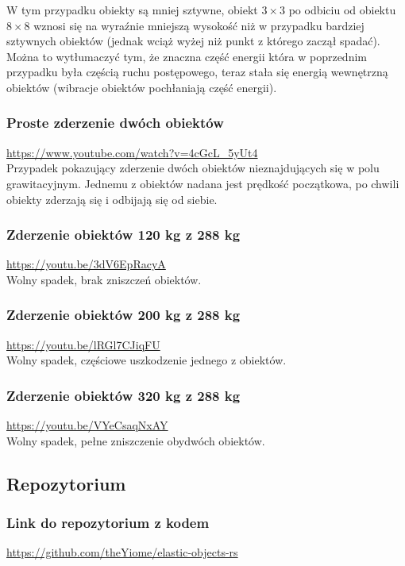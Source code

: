 \documentclass[12pt, letterpaper]{report}
\begin{document}
    W tym przypadku obiekty są mniej sztywne, obiekt $3 \times 3$ po odbiciu 
    od obiektu $8 \times  8$ wznosi się na wyraźnie mniejszą wysokość niż w przypadku bardziej sztywnych obiektów
    (jednak wciąż wyżej niż punkt z którego zaczął spadać). Można to wytłumaczyć tym,
    że znaczna część energii która w poprzednim przypadku była częścią ruchu postępowego,
    teraz stała się energią wewnętrzną obiektów (wibracje obiektów pochłaniają część energii).

    \subsubsection{Proste zderzenie dwóch obiektów}
    \url{https://www.youtube.com/watch?v=4cGcL_5yUt4} \\ 

    Przypadek pokazujący zderzenie dwóch obiektów nieznajdujących się w polu grawitacyjnym.
    Jednemu z obiektów nadana jest prędkość początkowa, po chwili obiekty zderzają się i 
    odbijają się od siebie.

    \subsubsection{Zderzenie obiektów 120 kg z 288 kg}
    \url{https://youtu.be/3dV6EpRacyA} \\

    Wolny spadek, brak zniszczeń obiektów.

    \subsubsection{Zderzenie obiektów 200 kg z 288 kg}
    \url{https://youtu.be/lRGl7CJiqFU} \\

    Wolny spadek, częściowe uszkodzenie jednego z obiektów.

    \subsubsection{Zderzenie obiektów 320 kg z 288 kg}
    \url{https://youtu.be/VYeCsaqNxAY} \\

    Wolny spadek, pełne zniszczenie obydwóch obiektów.

    \subsection{Repozytorium}
    \subsubsection{Link do repozytorium z kodem}
    \url{https://github.com/theYiome/elastic-objects-rs}
\end{document}
